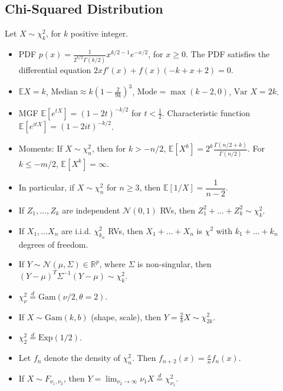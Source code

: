 \documentclass[twoside]{article}
\newcommand{\dis}{\displaystyle}
\newcommand\bbE{\mathbb{E}}
\newcommand\bbR{\mathbb{R}}
\newcommand\calN{\mathcal{N}}
\newcommand\Sg{\Sigma}
\def\t{\theta}
\newcommand\goesto{\rightarrow}
\newcommand\var{\text{Var }}
\begin{document}
\subsection{Chi-Squared Distribution}
Let $X \sim \chi_k^2$, for $k$ positive integer.

\begin{itemize}
\item PDF $p(x) = \displaystyle\frac{1}{2^{k/2}\Gamma(k/2)} x^{k/2 - 1} e^{-x/2}$, for $x \geq 0$. The PDF satisfies the differential equation $2x f'(x) + f(x) (-k + x + 2) = 0$.

\item $\bbE X = k$, $\text{Median} \approx k \left(1 - \frac{2}{9k} \right)^3$, $\text{Mode} = \max(k-2, 0)$, $\var X = 2k$.

\item MGF $\bbE [e^{tX}] = (1-2t)^{-k/2}$ for $t < \frac{1}{2}$. Characteristic function $\bbE [e^{itX}] = (1 - 2it)^{-k/2}$.

\item Moments: If $X \sim \chi_n^2$, then for $k > -n/2$, $\bbE [X^k] = 2^k \displaystyle\frac{\Gamma (n/2 + k)}{\Gamma (n/2)}$. For $k \leq -m/2$, $\bbE [X^k] = \infty$.

\item In particular, if $X \sim \chi_n^2$ for $n \geq 3$, then $\bbE [1/X] = \dfrac{1}{n-2}$.

\item If $Z_1, \dots, Z_k$ are independent $\calN(0,1)$ RVs, then $Z_1^2 + \dots + Z_k^2 \sim \chi_k^2$.

\item If $X_1, \dots X_n$ are i.i.d. $\chi_{k_n}^2$ RVs, then $X_1 + \dots + X_n$ is $\chi^2$ with $k_1 + \dots + k_n$ degrees of freedom.

\item If $Y \sim \calN(\mu, \Sg) \in \bbR^p$, where $\Sg$ is non-singular, then $(Y - \mu)^T \Sg^{-1} (Y - \mu) \sim \chi_k^2$.

\item $\chi_\nu^2 \stackrel{d}{=} \text{Gam}(\nu/2, \t = 2)$.

\item If $X \sim \text{Gam}(k, b)$ (shape, scale), then $Y = \frac{2}{b} X \sim \chi_{2k}^2$.

\item $\chi_2^2 \stackrel{d}{=} \text{Exp}(1/2)$.

\item Let $f_n$ denote the density of $\chi_n^2$. Then $f_{n+2}(x) = \displaystyle\frac{x}{n}f_n(x)$.

\item If $X \sim F_{\nu_1, \nu_2}$, then $Y = \dis\lim_{\nu_2 \goesto \infty} \nu_1 X \stackrel{d}{=} \chi_{\nu_1}^2$.
\end{itemize}
\end{document}
